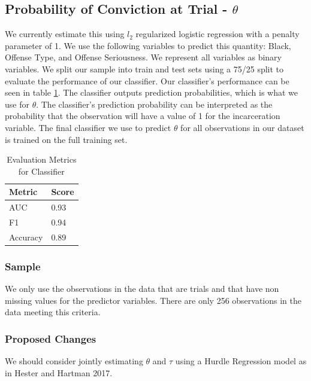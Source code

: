 \documentclass[11pt]{article}
\theoremstyle{ModifiedStyle}
\begin{document}
  \subsection{Probability of Conviction at Trial - $\theta$}
    \label{theta-estimation}
    We currently estimate this using $l_2$ regularized logistic regression with a penalty parameter of 1. We use the following variables to predict this quantity: Black, Offense Type, and Offense Seriousness. We represent all variables as binary variables. We split our sample into train and test sets using a 75/25 split to evaluate the performance of our classifier. Our classifier's performance can be seen in table \ref{classifier-performance}. The classifier outputs prediction probabilities, which is what we use for $\theta$. The classifier's prediction probability can be interpreted as the probability that the observation will have a value of 1 for the incarceration variable. The final classifier we use to predict $\theta$ for all observations in our dataset is trained on the full training set.

    \begin{table}[H]
      \centering
      \caption{Evaluation Metrics for Classifier}
      \label{classifier-performance}
      \begin{tabular}{|l|l|}
      \hline
      \textbf{Metric} & \textbf{Score} \\ \hline
      AUC             & 0.93           \\ \hline
      F1              & 0.94           \\ \hline
      Accuracy        & 0.89           \\ \hline
      \end{tabular}
    \end{table}

    \subsubsection{Sample}
      We only use the observations in the data that are trials and that have non missing values for the predictor variables. There are only 256 observations in the data meeting this criteria.

    \subsubsection{Proposed Changes}
      We should consider jointly estimating $\theta$ and $\tau$ using a Hurdle Regression model as in Hester and Hartman 2017.
\end{document}
